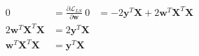 \newcommand{\matrix}[1]{\mathbf{#1}}
\newcommand{\vector}[1]{\mathbf{#1}}
\newcommand{\X}{\matrix{X}}
\newcommand{\y}{\vector{y}}
\newcommand{\w}{\vector{w}}
\begin{align*}
0 &= \frac{\partial \mathcal{L}_{LS}}{\partial \w} \
0 &= -2\y^T\X + 2\w^T\X^T\X \\
2\w^T\X^T\X &= 2\y^T\X \\
\w^T\X^T\X &= \y^T\X \\
\end{align*}

